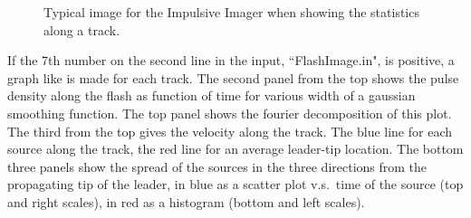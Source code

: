 {\begin{figure}[th]
	\caption{Typical image for the Impulsive Imager when showing the statistics along a track.}	 
\end{figure}

If the 7th number on the second line in the input, ``FlashImage.in", is positive, a graph like  is made for each track. The second panel from the top shows the pulse density along the flash as function of time for various width of a gaussian smoothing function. The top panel shows the fourier decomposition of this plot. The third from the top gives the velocity along the track. The blue line for each source along the track, the red line for an average leader-tip location. The bottom three panels show the spread of the sources in the three directions from the propagating tip of the leader, in blue as a scatter plot v.s.\ time of the source (top and right scales), in red as a histogram (bottom and left scales).
}  %
\clearpage 